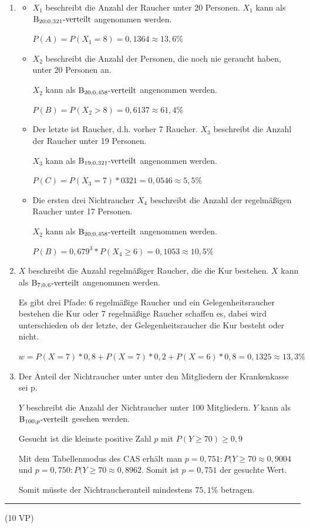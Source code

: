 \begin{lsg}{}
	\newcommand{\bin}[1]{\ensuremath\mathrm{B}_{#1} \text{-verteilt}}
	\begin{enumerate}
		\item
		\begin{itemize}
			\item $X_1$ beschreibt die Anzahl der Raucher unter 20 Personen. $X_1$ kann als $\bin{20;0,321}$ angenommen werden.

			$P(A)=P(X_1=8)=0,1364\approx 13,6\%$
			\item $X_2$ beschreibt die Anzahl der Personen, die noch nie geraucht haben, unter 20 Personen an.

			$X_2$ kann als $\bin{20;0,458}$ angenommen werden.

			$P(B)=P(X_2>8)=0,6137\approx 61,4\%$
			\item Der letzte ist Raucher, d.h. vorher 7 Raucher. $X_3$ beschreibt die Anzahl der Raucher unter 19 Personen.

			$X_3$ kann als $\bin{19;0,321}$ angenommen werden.

			$P(C)=P(X_3=7)*0321=0,0546\approx 5,5\%$
			\item Die ersten drei Nichtraucher $X_4$ beschreibt die Anzahl der regelmäßigen Raucher unter 17 Personen.

			$X_2$ kann als $\bin{20;0,458}$ angenommen werden.

			$P(B)=0,679^3*P(X_4\geq6)=0,1053\approx 10,5\%$
		\end{itemize}
		\item $X$ beschreibt die Anzahl regelmäßiger Raucher, die die Kur bestehen. $X$ kann als $\bin{7;0,6}$ angenommen werden.

		Es gibt drei Pfade: 6 regelmäßige Raucher und ein Gelegenheitsraucher bestehen die Kur oder 7 regelmäßige Raucher schaffen es, dabei wird unterschieden ob der letzte, der Gelegenheitsraucher die Kur besteht oder nicht.

		$w=P(X=7)*0,8+P(X=7)*0,2+P(X=6)*0,8=0,1325\approx 13,3\%$
		\item Der Anteil der Nichtraucher unter unter den Mitgliedern der Krankenkasse sei p.

		$Y$ beschreibt die Anzahl der Nichtraucher unter 100 Mitgliedern. $Y$ kann als $\bin{100;p}$ gesehen werden.

		Gesucht ist die kleinste positive Zahl $p$ mit $P(Y\geq 70)\geq 0,9$

		Mit dem Tabellenmodus des CAS erhält man $p=0,751: P(Y\geq 70\approx 0,9004$ und $p=0,750: P(Y\geq 70\approx 0,8962$. Somit ist $p=0,751$ der gesuchte Wert.

		Somit müsste der Nichtraucheranteil mindestens $75,1\%$ betragen.
	\end{enumerate}
\end{lsg}

\vfill

\hfill\rule{1.5cm}{0.4mm}

\hfill (10 VP)\hspace{0.22cm}


